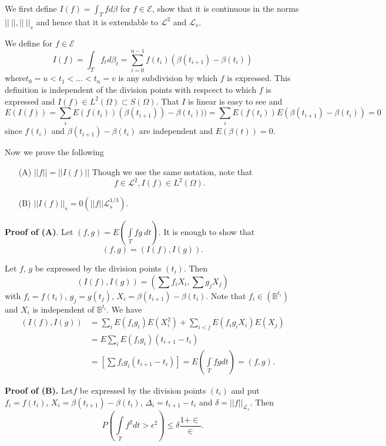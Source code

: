 We first define $I(f) = \int_T f d \beta $ for $f \in \mathscr{E}$,
show that it is continuous in the norms $|| ~ || , || ~ || _s$ and
hence that it is extendable to $\mathscr{L}^2$ and $\mathscr{L}_s$. 

We define for $f \in \mathscr{E}$ 
$$
I(f) = \int_T f_t d \beta_t = \sum^{ n - 1}_{ i = 0} f (t_i)(\beta
(t_{i + 1}) - \beta (t_i)) 
$$
where\pageoriginale $t_0 = u < t_1 < \ldots < t_n = v$ is any
subdivision by which 
$f$ is expressed. This definition is independent of the division
points 	with respcect to which $f$ is expressed and $I(f) \in L^2
(\Omega) \subset S (\Omega)$. That $I$ is linear is easy to see and  
{\fontsize{10pt}{12pt}\selectfont
$$
E(I (f)) = \sum_i E (f (t_i)) (\beta (t_{ i +1})) - \beta ( t_i))) =
\sum_i E(f(t_i)) E ( \beta ( t_{i+1})-\beta(t_{i})) = 0 
$$}\relax
since $f (t_i)$ and $\beta (t_{ i +1}) - \beta (t_i)$ are independent
and $E ( \beta( t )) = 0$.  

Now we prove the following 
\begin{itemize}
\item[(A)] $|| f || = || I (f) ||$ Though we use the same notation, note that 
  $$
  f \in \mathscr{L}^2 , I(f) \in L^2 (\Omega).
  $$

\item[(B)] $||I(f)||_s = 0 (|| f || \mathscr{L}_s ^{ 1/3})$. 
\end{itemize}

\noindent
\textbf{Proof of (A)}. Let $(f, g ) = E(\int\limits_T fg ~ dt)$. It is
enough to show that  
$$
(f, g) = (I(f), I(g)). 
$$

Let $f$, $g$ be expressed by the division points $(t_i)$. Then 
$$
(I (f), I(g)) = (\sum f_i X_i, \sum g_j X_j)
$$
with $f_i = f(t_i)$, $g_j = g(t_j)$, $X_i = \beta (t_{i+1} ) - \beta
(t_i)$. Note that $f_i \in (\mathbb{B}^{t_i})$ and $X_i$ is
independent of $ \mathbb{B}^{t_i}$. We have  
\begin{align*}
 ( I (f), I(g)) & = \sum_i E (f_i g_i ) E (X^2 _i) + \sum_{ i < j} E
  (f_i g_i X_i)E(X_j)\\ 
  & = E\sum_i E(f_i g_i) (t_{ i+1} - t_i) \\ 
  & = \left[ \sum f_i g_i (t_{ i +1} - t_i)\right] = E 
  \left(\int\limits_T fg dt\right) = (f, g). 
\end{align*}

\noindent
\textbf{Proof of (B).} Let\pageoriginale $f$ be expressed by the
division points $(t_i)$ and put $f_i = f(t_i)$, $X_i = \beta (t_{ i
  +1}) - \beta (t_i)$,
$\Delta_i = t_{i+1} - t_i$ and $\delta = || f ||_{\mathscr{L}_s}$. Then 
$$
P \left(\int\limits_T f^2 dt > \epsilon^2 \right) \leq \delta \frac{1 + \in}{\in}.
$$ 

